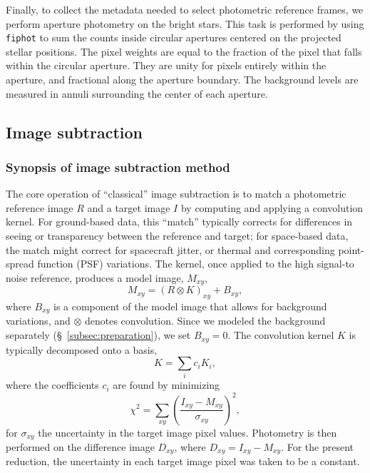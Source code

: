 \documentclass[12pt,twocolumn,tighten]{aastex62}
\begin{document}
Finally, to collect the metadata needed to select photometric
reference frames, we perform aperture photometry on the bright stars.
This task is performed by using \texttt{fiphot} to sum the counts
inside circular apertures centered on the projected stellar positions.
The pixel weights are equal to the fraction of the pixel that falls
within the circular aperture.  They are unity for pixels entirely
within the aperture, and fractional along the aperture boundary.  The
background levels are measured in annuli surrounding the center of
each aperture. 


\subsection{Image subtraction}
\label{subsec:imagesubtraction}

\subsubsection{Synopsis of image subtraction method}

The core operation of ``classical'' image subtraction is to match a
photometric reference image $R$ and a target image $I$ by computing
and applying a convolution kernel.  For ground-based data, this
``match'' typically corrects for differences in seeing or transparency
between the reference and target; for space-based data, the match
might correct for spacecraft jitter, or thermal and corresponding
point-spread function (PSF) variations.  The kernel, once applied to
the high signal-to noise reference, produces a model image, $M_{xy}$,
\begin{equation}
    M_{xy} = (R \otimes K)_{xy} + B_{xy},
    \label{eq:imagemodel}
\end{equation}
where $B_{xy}$ is a component of the model image that allows for
background variations, and $\otimes$ denotes convolution.  Since we
modeled the background separately (\S~\ref{subsec:preparation}), we
set $B_{xy}=0$.  The convolution kernel $K$ is typically decomposed
onto a basis,
\begin{equation}
K = \sum_i c_i K_i,
\end{equation}
where the coefficients $c_i$ are found by minimizing
\begin{equation}
    \chi^2 = \sum_{xy} \left( \frac{I_{xy} - M_{xy}}{\sigma_{xy}} \right)^2,
    \label{eq:chisq_conv}
\end{equation}
for $\sigma_{xy}$ the uncertainty in the target image pixel
values.  Photometry is then performed on the difference image
$D_{xy}$, where $D_{xy} = I_{xy} - M_{xy}$.  For the present
reduction, the uncertainty in each target image pixel was taken to be
a constant.	
\end{document}
